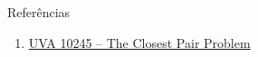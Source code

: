 \begin{frame}[fragile]{Referências}

    \begin{enumerate}
        \item \href{https://uva.onlinejudge.org/index.php?option=com_onlinejudge&Itemid=8&category=24&page=show_problem&problem=1186}{UVA 10245 -- The Closest Pair Problem}




    \end{enumerate}

\end{frame}
